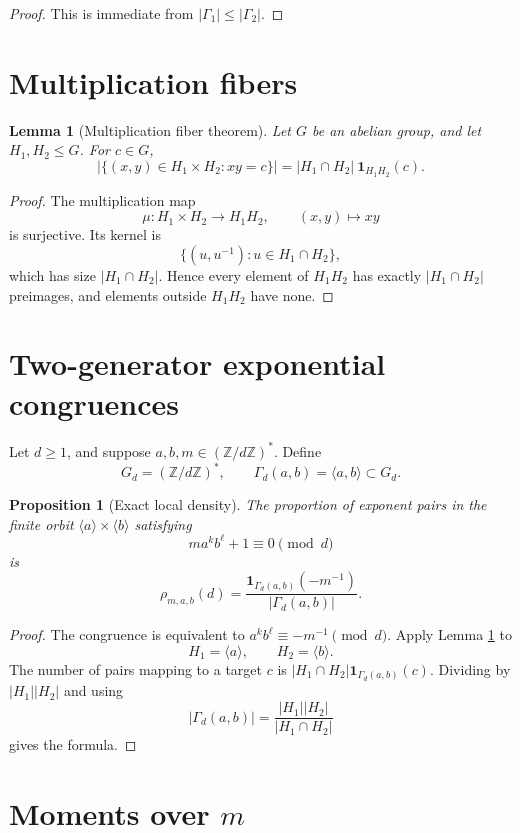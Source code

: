 \documentclass[11pt]{article}
\newtheorem{proposition}{Proposition}
\newtheorem{lemma}{Lemma}
\newcommand{\Z}{\mathbb Z}
\newcommand{\1}{\mathbf 1}
\begin{document}
\begin{proof}
This is immediate from \(|\Gamma_1|\le|\Gamma_2|\).
\end{proof}

\section{Multiplication fibers}

\begin{lemma}[Multiplication fiber theorem]\label{L:fiber}
Let \(G\) be an abelian group, and let \(H_1,H_2\le G\).  For \(c\in G\),
\[
|\{(x,y)\in H_1\times H_2:xy=c\}|
=
|H_1\cap H_2|\ \1_{H_1H_2}(c).
\]
\end{lemma}

\begin{proof}
The multiplication map
\[
\mu:H_1\times H_2\to H_1H_2,\qquad (x,y)\mapsto xy
\]
is surjective.  Its kernel is
\[
\{(u,u^{-1}):u\in H_1\cap H_2\},
\]
which has size \(|H_1\cap H_2|\).  Hence every element of \(H_1H_2\) has exactly \(|H_1\cap H_2|\) preimages, and elements outside \(H_1H_2\) have none.
\end{proof}

\section{Two-generator exponential congruences}

Let \(d\ge1\), and suppose \(a,b,m\in(\Z/d\Z)^*\).  Define
\[
G_d=(\Z/d\Z)^*,\qquad \Gamma_d(a,b)=\langle a,b\rangle\subset G_d.
\]

\begin{proposition}[Exact local density]\label{P:localdensity}
The proportion of exponent pairs in the finite orbit \(\langle a\rangle\times\langle b\rangle\) satisfying
\[
m a^k b^\ell+1\equiv0\pmod d
\]
is
\[
\rho_{m,a,b}(d)=
\frac{\1_{\Gamma_d(a,b)}(-m^{-1})}{|\Gamma_d(a,b)|}.
\]
\end{proposition}

\begin{proof}
The congruence is equivalent to \(a^k b^\ell\equiv -m^{-1}\pmod d\).  Apply Lemma \ref{L:fiber} to
\[
H_1=\langle a\rangle,\qquad H_2=\langle b\rangle.
\]
The number of pairs mapping to a target \(c\) is \(|H_1\cap H_2|\1_{\Gamma_d(a,b)}(c)\).  Dividing by \(|H_1||H_2|\) and using
\[
|\Gamma_d(a,b)|=\frac{|H_1||H_2|}{|H_1\cap H_2|}
\]
gives the formula.
\end{proof}

\section{Moments over \(m\)}
\end{document}
